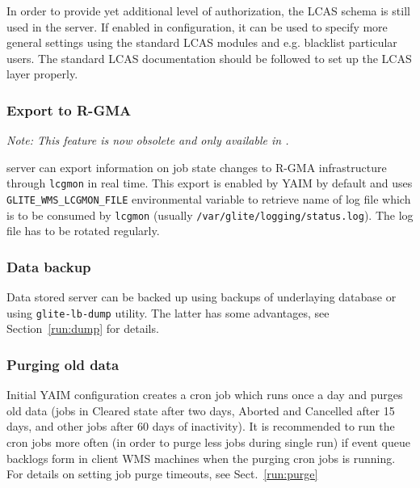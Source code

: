 In order to provide yet additional level of authorization, the LCAS
schema\cite{lcas} is still used in the server. If enabled in configuration,
it can be used to specify more general settings using the standard LCAS
modules and e.g. blacklist particular users. The standard LCAS documentation
should be followed to set up the LCAS layer properly.


\subsubsection{Export to R-GMA}

\emph{Note: This feature is now obsolete and only available in .}

{\sloppy
\LB server can export information on job state changes to R-GMA infrastructure through \verb'lcgmon' 
in real time. This export is enabled by YAIM by default and uses \verb'GLITE_WMS_LCGMON_FILE' 
environmental variable to retrieve name of log file which is to be consumed by \verb'lcgmon' (usually
\verb'/var/glite/logging/status.log'). The log file has to be rotated regularly.

}

\subsubsection{Data backup}
\label{inst:backup}

Data stored \LB server can be backed up using backups of underlaying database or using \verb'glite-lb-dump' utility.
The latter has some advantages, see Section~\ref{run:dump} for details.

\subsubsection{Purging old data}
\label{inst:purge}

Initial YAIM configuration creates a cron job which runs once a day and purges old 
data (jobs in Cleared state after two days, Aborted and Cancelled after 15 days, and other jobs 
after 60 days of inactivity). It is recommended to run the cron jobs more often (in order to purge less jobs
during single run) if event queue backlogs form in client WMS machines when the purging cron jobs is running.
For details on setting job purge timeouts, see Sect.~\ref{run:purge}


